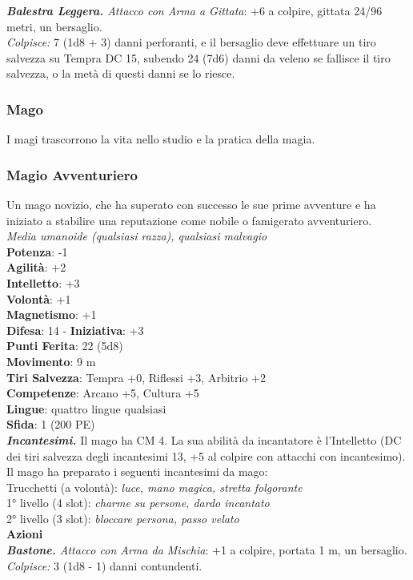 \begin{multicols}{2}
\emph{\textbf{Balestra Leggera.} Attacco con Arma a Gittata}: +6 a colpire, gittata 24/96 metri, un bersaglio. \\
\emph{Colpisce:} 7 (1d8 + 3) danni perforanti, e il bersaglio deve effettuare un tiro salvezza su Tempra DC 15, subendo 24 (7d6) danni da veleno se fallisce il tiro salvezza, o la metà di questi danni se lo riesce.\\

\subsubsection{Mago}

I magi trascorrono la vita nello studio e la pratica della magia.\\

\subsubsection{Magio Avventuriero}

Un mago novizio, che ha superato con successo le sue prime avventure e ha iniziato a stabilire una reputazione come nobile o famigerato avventuriero.\\
\emph{Media umanoide (qualsiasi razza), qualsiasi malvagio}\\
\textbf{Potenza}: -1\\
\textbf{Agilità}: +2\\
\textbf{Intelletto}: +3\\
\textbf{Volontà}: +1\\
\textbf{Magnetismo}: +1\\
\textbf{Difesa}: 14 - \textbf{Iniziativa}: +3\\
\textbf{Punti Ferita}: 22 (5d8)\\
\textbf{Movimento}: 9 m\\
\textbf{Tiri Salvezza}: Tempra +0, Riflessi +3, Arbitrio +2 \\
\textbf{Competenze}: Arcano +5, Cultura +5\\
\textbf{Lingue}: quattro lingue qualsiasi\\
\textbf{Sfida}: 1 (200 PE)\smallskip\\
\emph{\textbf{Incantesimi.}} Il mago ha CM 4. La sua abilità da incantatore è l'Intelletto (DC dei tiri salvezza degli incantesimi 13, +5 al colpire con attacchi con incantesimo). Il mago ha preparato i seguenti incantesimi da mago: \\
Trucchetti (a volontà): \emph{luce, mano magica, stretta folgorante} \\
1° livello (4 slot): \emph{charme su persone, dardo incantato} \\
2° livello (3 slot): \emph{bloccare persona, passo velato}\\
\smallskip\textbf{Azioni}\\
\emph{\textbf{Bastone.} Attacco con Arma da Mischia}: +1 a colpire, portata 1 m, un bersaglio.\\
\emph{Colpisce:} 3 (1d8 - 1) danni contundenti.\\


\end{multicols}
